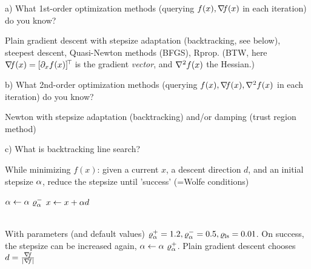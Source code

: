 a) What 1st-order optimization methods (querying $f(x),{\nabla_{\!\!}} f(x)$ in each iteration) do you know?

\begin{solution}
Plain gradient descent with stepsize adaptation (backtracking, see below), steepest descent, Quasi-Newton methods (BFGS), Rprop. (BTW, here ${\nabla_{\!\!}} f(x) = [\partial_x f(x)]^{\!\top\!}$ is the gradient \emph{vector}, and ${\nabla_{\!\!}^2} f(x)$ the Hessian.)
\end{solution}

b) What 2nd-order optimization methods (querying $f(x),{\nabla_{\!\!}} f(x), {\nabla_{\!\!}^2}
f(x)$ in each iteration) do you know?

\begin{solution}
Newton with stepsize adaptation (backtracking) and/or damping (trust region method)
\end{solution}

c) What is backtracking line search?

\begin{solution}
\newcommand{\step}{{d}}

While minimizing $f(x)$: given a current $x$, a descent direction $\step$, and an initial stepsize $\alpha$, reduce the stepsize until 'success' (=Wolfe conditions)\\
\begin{algo}
\While{$f(x+\a\step) > f(x) + \lsstop \na f(x)^\T (\a\step)$} 
\State $\alpha \gets \alpha~\varrho_\alpha^-$ 
\EndWhile
\State $x \gets x + \a\step$ 
\end{algo}\\
With parameters (and default values) $\varrho_\alpha^+=1.2, \varrho_\alpha^-=0.5, \varrho_{\text{ls}}=0.01$. On success, the stepsize can be increased again, $\alpha \gets \alpha~\varrho_\alpha^+$. Plain gradient descent chooses $d = \frac{{\nabla_{\!\!}} f}{|{\nabla_{\!\!}} f|}$
\end{solution}

\exerfoot
